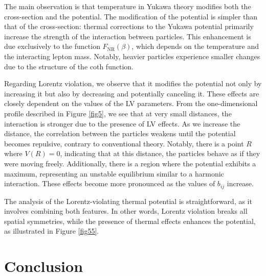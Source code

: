 \documentclass[11pt,showpacs,preprintnumbers,amsmath,amssymb,prd,nofootinbib,superscriptaddress]{revtex4-2}
\begin{document}
{The main observation is that temperature in Yukawa theory modifies both the cross-section and the potential. The modification of the potential is simpler than that of the cross-section: thermal corrections to the Yukawa potential primarily increase the strength of the interaction between particles. This enhancement is due exclusively to the function $F_{\text{NR}}(\beta)$, which depends on the temperature and the interacting lepton mass. Notably, heavier particles experience smaller changes due to the structure of the coth function.

Regarding Lorentz violation, we observe that it modifies the potential not only by increasing it but also by decreasing and potentially canceling it. These effects are closely dependent on the values of the LV parameters. From the one-dimensional profile described in Figure \ref{fig5}, we see that at very small distances, the interaction is stronger due to the presence of LV effects. As we increase the distance, the correlation between the particles weakens until the potential becomes repulsive, contrary to conventional theory. Notably, there is a point $R$ where $V(R) = 0$, indicating that at this distance, the particles behave as if they were moving freely. Additionally, there is a region where the potential exhibits a maximum, representing an unstable equilibrium similar to a harmonic interaction. These effects become more pronounced as the values of $b_{ij}$ increase.

The analysis of the Lorentz-violating thermal potential is straightforward, as it involves combining both features. In other words, Lorentz violation breaks all spatial symmetries, while the presence of thermal effects enhances the potential, as illustrated in Figure \ref{fig55}.


\section{Conclusion}\label{secconclusions}

}
\end{document}
